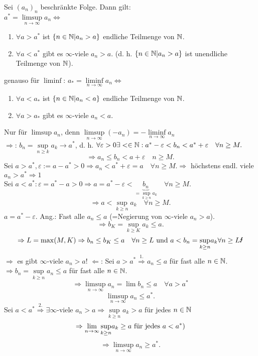 \documentclass[../ana1.tex]{subfiles}
\begin{document}
\begin{satz}
	Sei \((a_n)_n\) beschränkte Folge. Dann gilt:\\
	\(a^* = \limsup\limits_{n\rightarrow\infty}a_n \Leftrightarrow \)
	\begin{enumerate}
		\item \(\forall a> a^* \) ist \( \{n\in\mathbb{N} |a_n>a \} \) endliche Teilmenge von \(\mathbb{N}\).
		\item \( \forall a<a^* \) gibt es \(\infty\)-viele \(a_n >a\). (d. h. \( \{ n\in\mathbb{N}|a_n>a \} \) ist unendliche Teilmenge von \(\mathbb{N}\)).
	\end{enumerate}
	genauso für \( \liminf \):
	\(a_* = \liminf\limits_{n\rightarrow\infty}a_n \Leftrightarrow \)
	\begin{enumerate}
		\item \(\forall a< a_* \) ist \( \{n\in\mathbb{N} |a_n<a \} \) endliche Teilmenge von \(\mathbb{N}\).
		\item \( \forall a>a_* \) gibt es \(\infty\)-viele \(a_n<a\).
	\end{enumerate}
\end{satz}
\begin{bew}
	Nur für \( \limsup a_n \), denn \( \limsup\limits_{n\rightarrow\infty}(-a_n) = -\liminf\limits_{n\rightarrow\infty} a_n \)\\
	\glqq\( \Rightarrow \)\grqq: \(b_n = \underset{n\geq k}{\sup}a_k \rightarrow a^* \), d. h. \( \forall \varepsilon>0\exists <\in\mathbb{N}: a^*-\varepsilon < b_n < a^* + \varepsilon \quad \forall n\geq M. \)\\
	\[ \Rightarrow a_n \leq b_n < a + \varepsilon \quad n\geq M. \]
	Sei \(  a>a^*, \varepsilon := a-a^* >0 \Rightarrow a_n < a^* + \varepsilon = a \quad \forall n\geq M. \Rightarrow \) höchstens endl. viele \( a_n >a^* \Rightarrow 1 \)\\
	Sei \( a< a^*: \varepsilon = a^*-a >0 \Rightarrow a=a^*-\varepsilon < \underbrace{b_n}_{=\underset{k\geq n}{\sup} a_k} \quad \forall n\geq M. \)\\
	\[ \Rightarrow a < \underset{k\geq n}{\sup} a_k \quad \forall n\geq M. \]
	\(a=a^* - \varepsilon \).
	Ang.: Fast alle \(a_n \leq a \) (=Negierung von \( \infty \)-viele \(a_n>a\)).\\
	\[ \Rightarrow b_K = \underset{k\geq K}{\sup} a_k \leq a. \]
	\[ \Rightarrow L = \max(M,K) \Rightarrow b_n \leq b_K \leq a \quad \forall n\geq L \text{ und } a<b_n=\underset{k\geq n}{\sup}a_k \forall n\geq L \text{\Lightning} \]
	\( \Rightarrow \) es gibt \(\infty\)-viele \(a_n>a\)!
	\glqq\( \Leftarrow \)\grqq: Sei \(a>a^* \overset{\text{1.}}{\Rightarrow} a_n \leq a \) für fast alle \(n\in\mathbb{N}\).\\
	\( \Rightarrow b_n = \underset{k\geq n}{\sup}a_n \leq a \) für fast alle \(n\in\mathbb{N}\).\\
	\[ \Rightarrow \limsup\limits_{n\rightarrow\infty} a_n = \lim b_n \leq a \quad \forall a> a^* \]
	\[ \limsup\limits_{n\rightarrow\infty} a_n \leq a^*. \]
	Sei \(a<a^* \overset{\text{2.}}{\Rightarrow} \exists \infty \)-viele \(a_n > a \Rightarrow \underset{k\geq n}{\sup} a_k > a \) für jedes \(n\in\mathbb{N}\) 
	\[ \Rightarrow \lim\limits_{n\rightarrow\infty}\underset{k\geq n}{\sup}a_k \geq a \text{ für jedes }a<a^*) \]
	\[ \Rightarrow \limsup\limits_{n\rightarrow\infty} a_n\geq a^*. \]
\end{bew}
\end{document}
